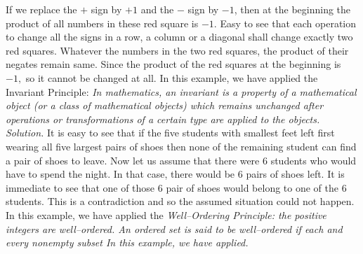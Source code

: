\begin{multicols}{2}
\begin{center}
	\end{center}	
	If we replace the $+$ sign by $+1$ and the $-$ sign by $-1$, then at the beginning the product of all numbers in these red square is $-1.$ 
	Easy to see that each operation to change all the signs in a row, a column or a diagonal shall change exactly two red squares.
	Whatever the numbers in the two red squares, the product of their negates remain same.
	Since the product of the red squares at the beginning is $-1,$ so it cannot be changed at all.
	\vskip 0.1cm
	In this example, we have applied the Invariant Principle: \textit{In mathematics, an invariant is a property of a mathematical object
		(or a class of mathematical objects) which remains unchanged after operations or transformations of a certain type are applied to the objects.} 
	\vskip 0.2cm
	\vskip 0.2cm
	\textit{Solution.}
	It is easy to see that if the five students with smallest feet left first wearing all five largest pairs of shoes
	then none of the remaining student can find a pair of shoes to leave.
	Now let us assume that there were $6$ students who would have to spend the night. In that case, there would be $6$ pairs of shoes left. It is immediate to see that one of those $6$ pair of shoes would belong to one of the $6$ students. This is a contradiction and so the assumed situation could not happen.
	\vskip 0.1cm
	In this example, we have applied the \textit{Well--Ordering Principle: the positive integers are well--ordered.
		An ordered set is said to be well--ordered if each and every nonempty subset In this example, we have applied.} 
	\vskip 0.2cm
\end{multicols}
